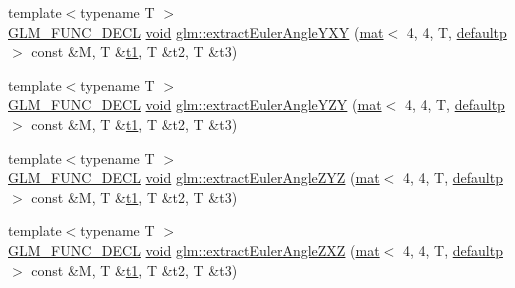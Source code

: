 \begin{DoxyCompactItemize}
\item 
{\footnotesize template$<$typename T $>$ }\\\mbox{\hyperlink{setup_8hpp_ab2d052de21a70539923e9bcbf6e83a51}{G\+L\+M\+\_\+\+F\+U\+N\+C\+\_\+\+D\+E\+CL}} \mbox{\hyperlink{_s_d_l__opengles2__gl2ext_8h_ae5d8fa23ad07c48bb609509eae494c95}{void}} \mbox{\hyperlink{group__gtx__euler__angles_gaab8868556361a190db94374e9983ed39}{glm\+::extract\+Euler\+Angle\+Y\+XY}} (\mbox{\hyperlink{structglm_1_1mat}{mat}}$<$ 4, 4, T, \mbox{\hyperlink{namespaceglm_a36ed105b07c7746804d7fdc7cc90ff25a9d21ccd8b5a009ec7eb7677befc3bf51}{defaultp}} $>$ const \&M, T \&\mbox{\hyperlink{_s_d_l__opengl__glext_8h_af48031a37b713afa3b0d0d7d29653d7c}{t1}}, T \&t2, T \&t3)
\item 
{\footnotesize template$<$typename T $>$ }\\\mbox{\hyperlink{setup_8hpp_ab2d052de21a70539923e9bcbf6e83a51}{G\+L\+M\+\_\+\+F\+U\+N\+C\+\_\+\+D\+E\+CL}} \mbox{\hyperlink{_s_d_l__opengles2__gl2ext_8h_ae5d8fa23ad07c48bb609509eae494c95}{void}} \mbox{\hyperlink{group__gtx__euler__angles_ga11dad972c109e4bf8694c915017c44a6}{glm\+::extract\+Euler\+Angle\+Y\+ZY}} (\mbox{\hyperlink{structglm_1_1mat}{mat}}$<$ 4, 4, T, \mbox{\hyperlink{namespaceglm_a36ed105b07c7746804d7fdc7cc90ff25a9d21ccd8b5a009ec7eb7677befc3bf51}{defaultp}} $>$ const \&M, T \&\mbox{\hyperlink{_s_d_l__opengl__glext_8h_af48031a37b713afa3b0d0d7d29653d7c}{t1}}, T \&t2, T \&t3)
\item 
{\footnotesize template$<$typename T $>$ }\\\mbox{\hyperlink{setup_8hpp_ab2d052de21a70539923e9bcbf6e83a51}{G\+L\+M\+\_\+\+F\+U\+N\+C\+\_\+\+D\+E\+CL}} \mbox{\hyperlink{_s_d_l__opengles2__gl2ext_8h_ae5d8fa23ad07c48bb609509eae494c95}{void}} \mbox{\hyperlink{group__gtx__euler__angles_gafdfa880a64b565223550c2d3938b1aeb}{glm\+::extract\+Euler\+Angle\+Z\+YZ}} (\mbox{\hyperlink{structglm_1_1mat}{mat}}$<$ 4, 4, T, \mbox{\hyperlink{namespaceglm_a36ed105b07c7746804d7fdc7cc90ff25a9d21ccd8b5a009ec7eb7677befc3bf51}{defaultp}} $>$ const \&M, T \&\mbox{\hyperlink{_s_d_l__opengl__glext_8h_af48031a37b713afa3b0d0d7d29653d7c}{t1}}, T \&t2, T \&t3)
\item 
{\footnotesize template$<$typename T $>$ }\\\mbox{\hyperlink{setup_8hpp_ab2d052de21a70539923e9bcbf6e83a51}{G\+L\+M\+\_\+\+F\+U\+N\+C\+\_\+\+D\+E\+CL}} \mbox{\hyperlink{_s_d_l__opengles2__gl2ext_8h_ae5d8fa23ad07c48bb609509eae494c95}{void}} \mbox{\hyperlink{group__gtx__euler__angles_ga59359fef9bad92afaca55e193f91e702}{glm\+::extract\+Euler\+Angle\+Z\+XZ}} (\mbox{\hyperlink{structglm_1_1mat}{mat}}$<$ 4, 4, T, \mbox{\hyperlink{namespaceglm_a36ed105b07c7746804d7fdc7cc90ff25a9d21ccd8b5a009ec7eb7677befc3bf51}{defaultp}} $>$ const \&M, T \&\mbox{\hyperlink{_s_d_l__opengl__glext_8h_af48031a37b713afa3b0d0d7d29653d7c}{t1}}, T \&t2, T \&t3)

\end{DoxyCompactItemize}
